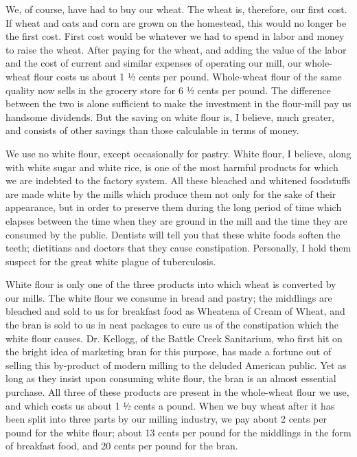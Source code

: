 \documentclass{book}
\begin{document}
We, of course, have had to buy our wheat. The wheat is, therefore, our first cost. If wheat and oats and corn are grown on the homestead, this would no longer be the first cost. First cost would be whatever we had to spend in labor and money to raise the wheat. After paying for the wheat, and adding the value of the labor and the cost of current and similar expenses of operating our mill, our whole-wheat flour costs us about 1 ½ cents per pound. Whole-wheat flour of the same quality now sells in the grocery store for 6 ½ cents per pound. The difference between the two is alone sufficient to make the investment in the flour-mill pay us handsome dividends. But the saving on white flour is, I believe, much greater, and consists of other savings than those calculable in terms of money.

We use no white flour, except occasionally for pastry. White flour, I believe, along with white sugar and white rice, is one of the most harmful products for which we are indebted to the factory system. All these bleached and whitened foodstuffs are made white by the mills which produce them not only for the sake of their appearance, but in order to preserve them during the long period of time which elapses between the time when they are ground in the mill and the time they are consumed by the public. Dentists will tell you that these white foods soften the teeth; dietitians and doctors that they cause constipation. Personally, I hold them suspect for the great white plague of tuberculosis.

White flour is only one of the three products into which wheat is converted by our mills. The white flour we consume in bread and pastry; the middlings are bleached and sold to us for breakfast food as Wheatena of Cream of Wheat, and the bran is sold to us in neat packages to cure us of the constipation which the white flour causes. Dr. Kellogg, of the Battle Creek Sanitarium, who first hit on the bright idea of marketing bran for this purpose, has made a fortune out of selling this by-product of modern milling to the deluded American public. Yet as long as they insist upon consuming white flour, the bran is an almost essential purchase. All three of these products are present in the whole-wheat flour we use, and which costs us about 1 ½ cents a pound. When we buy wheat after it has been split into three parts by our milling industry, we pay about 2 cents per pound for the white flour; about 13 cents per pound for the middlings in the form of breakfast food, and 20 cents per pound for the bran.
\end{document}

